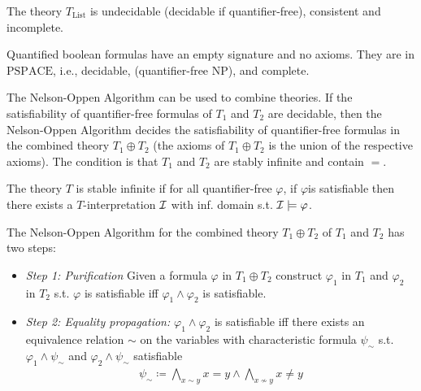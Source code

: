 \begin{theorem}
    The theory $T_{\mathrm{List}}$ is undecidable (decidable if quantifier-free), consistent and incomplete.
\end{theorem}


\begin{remark}[QBF]
    Quantified boolean formulas have an empty signature and no axioms. They are in $\mathrm{PSPACE}$, i.e., decidable, (quantifier-free $\mathrm{NP}$), and complete.
\end{remark}

\begin{remark}
    The Nelson-Oppen Algorithm can be used to combine theories. 
    If the satisfiability of quantifier-free formulas of $T_1$ and $T_2$ are decidable, then the Nelson-Oppen Algorithm decides the satisfiability of quantifier-free formulas in the combined theory $T_1 \oplus T_2$ (the axioms of $T_1 \oplus T_2$ is the union of the respective axioms).
    The condition is that $T_1$ and $T_2$ are stably infinite and contain $=$. 
\end{remark}

\begin{definition}
    The theory $T$ is stable infinite if for all quantifier-free $\varphi$, if $\varphi $is satisfiable then there exists a $T$-interpretation $\mathcal{I}$ with inf. domain s.t. $\mathcal{I}\models \varphi$.
\end{definition}


\begin{remark}
    The Nelson-Oppen Algorithm for the combined theory $T_1 \oplus T_2$ of $T_1$ and $T_2$ has two steps:
    \begin{itemize}
        \item \emph{Step 1: Purification} Given a formula $\varphi$ in $T_1 \oplus T_2$ construct $\varphi_1$ in $T_1$  and $\varphi_2$ in $T_2$ s.t. $\varphi$ is satisfiable iff $\varphi_1\land \varphi_2$ is satisfiable.

        \item \emph{Step 2: Equality propagation:} $\varphi_1\land \varphi_2$ is satisfiable iff there exists an equivalence relation $\sim$ on the variables with characteristic formula $\psi_{\sim}$ s.t. $\varphi_1\land \psi_{\sim}$ and $\varphi_2\land \psi_{\sim}$ satisfiable
        \begin{align*}
            \psi_{\sim}\coloneqq \bigwedge_{x \sim y} x=y \land \bigwedge_{x\not\sim y} x\neq y 
        \end{align*}
    \end{itemize}
\end{remark}


